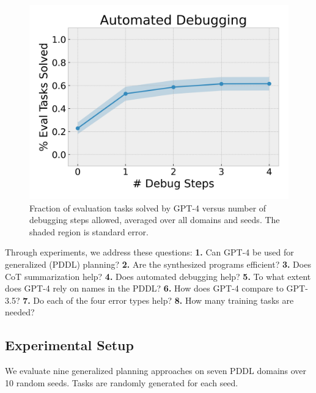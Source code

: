 \documentclass[letterpaper]{article} %
\begin{document}
\begin{figure}[t]
\centering
\includegraphics[width=0.6\columnwidth]{num_automated_debug.png}
\caption{Fraction of evaluation tasks solved by GPT-4 versus number of debugging steps allowed, averaged over all domains and seeds. The shaded region is standard error.}
\label{fig:automated_debugging}
\end{figure}





Through experiments, we address these questions:
\textbf{1.} Can GPT-4 be used for generalized (PDDL) planning?
\textbf{2.} Are the synthesized programs efficient?
\textbf{3.} Does CoT summarization help?
\textbf{4.} Does automated debugging help?
\textbf{5.} To what extent does GPT-4 rely on names in the PDDL?
\textbf{6.} How does GPT-4 compare to GPT-3.5?
\textbf{7.} Do each of the four error types help?
\textbf{8.} How many training tasks are needed?

\subsection{Experimental Setup}
We evaluate nine generalized planning approaches on seven PDDL domains over 10 random seeds.
Tasks are randomly generated for each seed.
\end{document}

